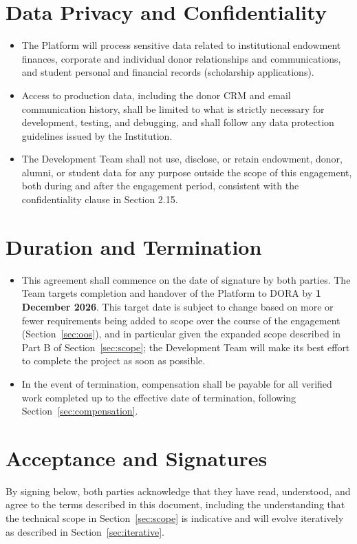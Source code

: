 \documentclass[11pt]{article}
\begin{document}
\section{Data Privacy and Confidentiality}
\begin{itemize}[leftmargin=1.4em, itemsep=3pt]
\item The Platform will process sensitive data related to institutional endowment finances, corporate and individual donor relationships and communications, and student personal and financial records (scholarship applications).
\item Access to production data, including the donor CRM and email communication history, shall be limited to what is strictly necessary for development, testing, and debugging, and shall follow any data protection guidelines issued by the Institution.
\item The Development Team shall not use, disclose, or retain endowment, donor, alumni, or student data for any purpose outside the scope of this engagement, both during and after the engagement period, consistent with the confidentiality clause in Section 2.15.
\end{itemize}

\section{Duration and Termination}
\label{sec:duration}
\begin{itemize}[leftmargin=1.4em, itemsep=3pt]
\item This agreement shall commence on the date of signature by both parties. The Team targets completion and handover of the Platform to DORA by \textbf{1 December 2026}. This target date is subject to change based on more or fewer requirements being added to scope over the course of the engagement (Section~\ref{sec:oos}), and in particular given the expanded scope described in Part B of Section~\ref{sec:scope}; the Development Team will make its best effort to complete the project as soon as possible.
\item In the event of termination, compensation shall be payable for all verified work completed up to the effective date of termination, following Section~\ref{sec:compensation}.
\end{itemize}

\section{Acceptance and Signatures}
By signing below, both parties acknowledge that they have read, understood, and agree to the terms described in this document, including the understanding that the technical scope in Section~\ref{sec:scope} is indicative and will evolve iteratively as described in Section~\ref{sec:iterative}.
\end{document}
